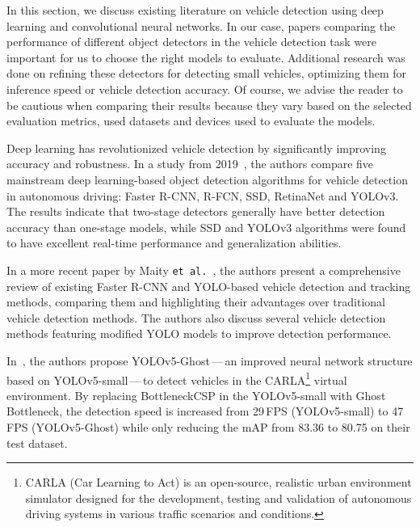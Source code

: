 In this section, we discuss existing literature on vehicle detection using deep
learning and convolutional neural networks. In our case, papers comparing the
performance of different object detectors in the vehicle detection task were
important for us to choose the right models to evaluate. Additional research was
done on refining these detectors for detecting small vehicles, optimizing them
for inference speed or vehicle detection accuracy. Of course, we advise the
reader to be cautious when comparing their results because they vary based on
the selected evaluation metrics, used datasets and devices used to evaluate the
models.

Deep learning has revolutionized vehicle detection by significantly improving
accuracy and robustness. In a study from 2019~\cite{Wang2019}, the authors
compare five mainstream deep learning-based object detection algorithms for
vehicle detection in autonomous driving: Faster R-CNN, R-FCN, SSD, RetinaNet
and YOLOv3. The results indicate that two-stage detectors generally have better
detection accuracy than one-stage models, while SSD and YOLOv3 algorithms were
found to have excellent real-time performance and generalization abilities. 

In a more recent paper by Maity \texttt{et al.}~\cite{Maity2021},
the authors present a comprehensive review of existing Faster R-CNN and
YOLO-based vehicle detection and tracking methods, comparing them and
highlighting their advantages over traditional vehicle detection methods. The
authors also discuss several vehicle detection methods featuring modified YOLO
models to improve detection performance.

In~\cite{Wu2021}, the authors propose YOLOv5-Ghost\,---\,an improved neural
network structure based on YOLOv5-small\,---\,to detect vehicles in the
CARLA\footnote{CARLA (Car Learning to Act) is an open-source, realistic urban
environment simulator designed for the development, testing and validation of
autonomous driving systems in various traffic scenarios and conditions.} virtual
environment. By replacing BottleneckCSP in the YOLOv5-small with Ghost
Bottleneck, the detection speed is increased from 29\,FPS (YOLOv5-small) to 47\,FPS
(YOLOv5-Ghost) while only reducing the mAP from \num{83.36} to \num{80.75}
on their test dataset.














